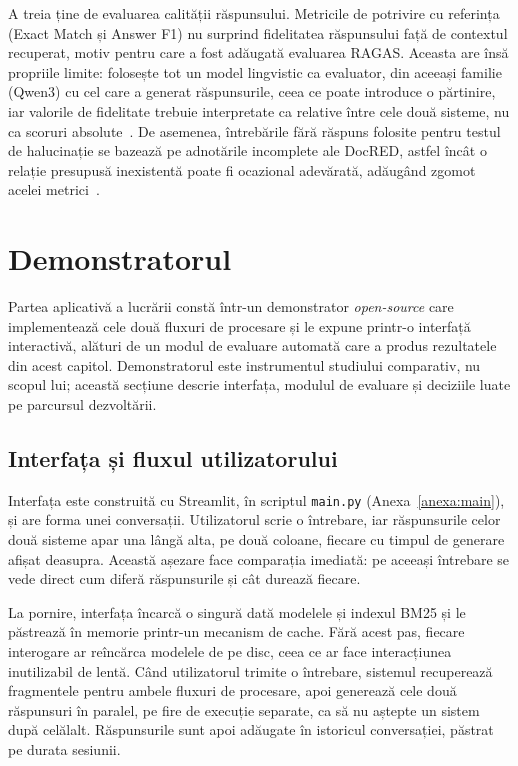 A treia ține de evaluarea calității răspunsului. Metricile de potrivire cu referința (Exact Match și Answer F1) nu surprind fidelitatea răspunsului față de contextul recuperat, motiv pentru care a fost adăugată evaluarea RAGAS. Aceasta are însă propriile limite: folosește tot un model lingvistic ca evaluator, din aceeași familie (Qwen3) cu cel care a generat răspunsurile, ceea ce poate introduce o părtinire, iar valorile de fidelitate trebuie interpretate ca relative între cele două sisteme, nu ca scoruri absolute~\cite{es2024ragas}. De asemenea, întrebările fără răspuns folosite pentru testul de halucinație se bazează pe adnotările incomplete ale DocRED, astfel încât o relație presupusă inexistentă poate fi ocazional adevărată, adăugând zgomot acelei metrici~\cite{tan2022redocred}.

\section{Demonstratorul}

Partea aplicativă a lucrării constă într-un demonstrator \textit{open-source} care implementează cele două fluxuri de procesare și le expune printr-o interfață interactivă, alături de un modul de evaluare automată care a produs rezultatele din acest capitol. Demonstratorul este instrumentul studiului comparativ, nu scopul lui; această secțiune descrie interfața, modulul de evaluare și deciziile luate pe parcursul dezvoltării.

\subsection{Interfața și fluxul utilizatorului}

Interfața este construită cu Streamlit, în scriptul \texttt{main.py} (Anexa~\ref{anexa:main}), și are forma unei conversații. Utilizatorul scrie o întrebare, iar răspunsurile celor două sisteme apar una lângă alta, pe două coloane, fiecare cu timpul de generare afișat deasupra. Această așezare face comparația imediată: pe aceeași întrebare se vede direct cum diferă răspunsurile și cât durează fiecare.

La pornire, interfața încarcă o singură dată modelele și indexul BM25 și le păstrează în memorie printr-un mecanism de cache. Fără acest pas, fiecare interogare ar reîncărca modelele de pe disc, ceea ce ar face interacțiunea inutilizabil de lentă. Când utilizatorul trimite o întrebare, sistemul recuperează fragmentele pentru ambele fluxuri de procesare, apoi generează cele două răspunsuri în paralel, pe fire de execuție separate, ca să nu aștepte un sistem după celălalt. Răspunsurile sunt apoi adăugate în istoricul conversației, păstrat pe durata sesiunii.

